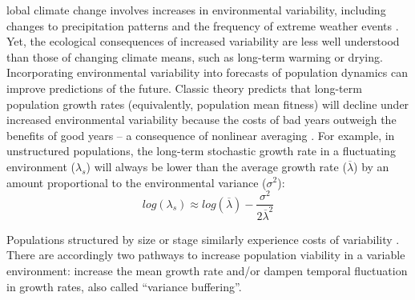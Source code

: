 \documentclass[9pt,twocolumn,twoside]{pnas-new}
\begin{document}


lobal climate change involves increases in environmental variability, including changes to precipitation patterns and the frequency of extreme weather events \cite{seneviratne2012changes, ipcc_2021}.
Yet, the ecological consequences of increased variability are less well understood than those of changing climate means, such as long-term warming or drying. 
Incorporating environmental variability into forecasts of population dynamics can improve predictions of the future.
Classic theory predicts that long-term population growth rates (equivalently, population mean fitness) will decline under increased environmental variability because the costs of bad years outweigh the benefits of good years -- a consequence of nonlinear averaging \cite{lewontin_population_1969,tuljapurkar_population_1982}.
For example, in unstructured populations, the long-term stochastic growth rate in a fluctuating environment ($\lambda_s$) will always be lower than the average growth rate ($\overline{\lambda}$) by an amount proportional to the environmental variance ($\sigma^2$): 
\begin{equation}
	log(\lambda_s)  \approx log(\overline{\lambda}) - \frac{\sigma^2}{2\overline{\lambda}^2}
\end{equation}

\noindent Populations structured by size or stage similarly experience costs of variability \cite{cohen1979comparative, tuljapurkar2013population}.
There are accordingly two pathways to increase population viability in a variable environment: increase the mean growth rate and/or dampen temporal fluctuation in growth rates, also called ``variance buffering''.
\end{document}
